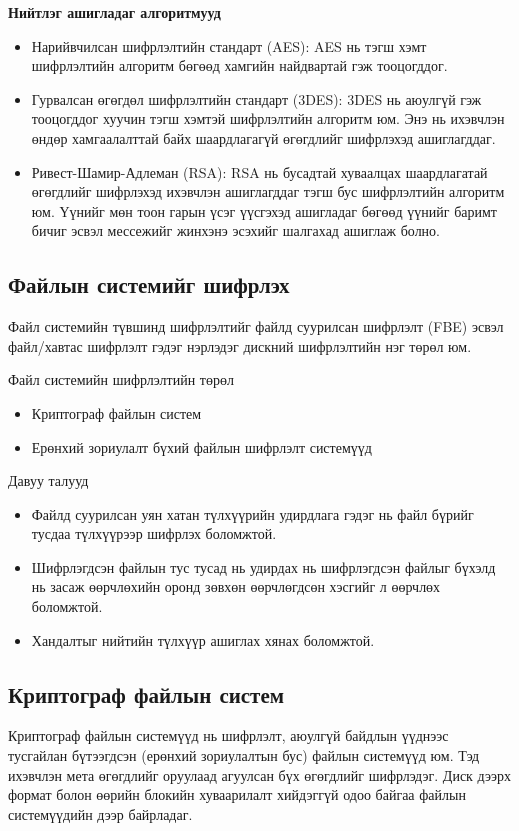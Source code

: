 \textbf{Нийтлэг ашигладаг алгоритмууд}
\begin{itemize}
    \item Нарийвчилсан шифрлэлтийн стандарт (AES): AES нь тэгш хэмт шифрлэлтийн алгоритм бөгөөд хамгийн найдвартай гэж тооцогддог.
    \item Гурвалсан өгөгдөл шифрлэлтийн стандарт (3DES): 3DES нь аюулгүй гэж тооцогддог хуучин тэгш хэмтэй шифрлэлтийн алгоритм юм. Энэ нь ихэвчлэн өндөр хамгаалалттай байх шаардлагагүй өгөгдлийг шифрлэхэд ашиглагддаг.
    \item Ривест-Шамир-Адлеман (RSA): RSA нь бусадтай хуваалцах шаардлагатай өгөгдлийг шифрлэхэд ихэвчлэн ашиглагддаг тэгш бус шифрлэлтийн алгоритм юм. Үүнийг мөн тоон гарын үсэг үүсгэхэд ашигладаг бөгөөд үүнийг баримт бичиг эсвэл мессежийг жинхэнэ эсэхийг шалгахад ашиглаж болно.
\end{itemize}

\subsection*{Файлын системийг шифрлэх}
Файл системийн түвшинд шифрлэлтийг файлд суурилсан шифрлэлт (FBE) эсвэл файл/хавтас шифрлэлт гэдэг нэрлэдэг дискний шифрлэлтийн нэг төрөл юм.\cite{WikiEnFileSystem}

Файл системийн шифрлэлтийн төрөл
\begin{itemize}
    \item Криптограф файлын систем
    \item Ерөнхий зориулалт бүхий файлын шифрлэлт системүүд
\end{itemize}

Давуу талууд
\begin{itemize}
    \item Файлд суурилсан уян хатан түлхүүрийн удирдлага гэдэг нь файл бүрийг тусдаа түлхүүрээр шифрлэх боломжтой.
    \item Шифрлэгдсэн файлын тус тусад нь удирдах нь шифрлэгдсэн файлыг бүхэлд нь засаж өөрчлөхийн оронд зөвхөн өөрчлөгдсөн хэсгийг л өөрчлөх боломжтой.
    \item Хандалтыг нийтийн түлхүүр ашиглах хянах боломжтой.
\end{itemize}

\subsection*{Криптограф файлын систем}

Криптограф файлын системүүд нь шифрлэлт, аюулгүй байдлын үүднээс тусгайлан бүтээгдсэн (ерөнхий зориулалтын бус) файлын системүүд юм. Тэд ихэвчлэн мета өгөгдлийг оруулаад агуулсан бүх өгөгдлийг шифрлэдэг. Диск дээрх формат болон өөрийн блокийн хуваарилалт хийдэггүй одоо байгаа файлын системүүдийн дээр байрладаг.

